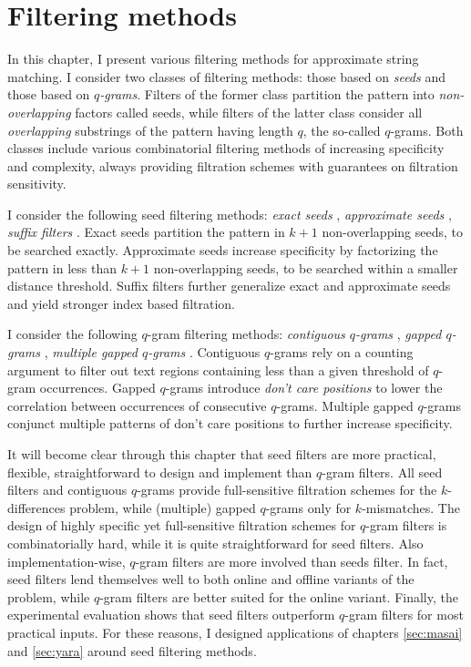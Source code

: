 \chapter{Filtering methods}
\label{sec:filter}

In this chapter, I present various filtering methods for approximate string matching.
I consider two classes of filtering methods: those based on \emph{seeds} and those based on \emph{$q$-grams}.
Filters of the former class partition the pattern into \emph{non-overlapping} factors called seeds, while filters of the latter class consider all \emph{overlapping} substrings of the pattern having length $q$, the so-called $q$-grams.
Both classes include various combinatorial filtering methods of increasing specificity and complexity, always providing filtration schemes with guarantees on filtration sensitivity.

I consider the following seed filtering methods:
\emph{exact seeds} \citep{Baeza1992},
\emph{approximate seeds} \citep{Myers1994,Navarro2000},
\emph{suffix filters} \citep{Kaerkkaeinen2007}.
Exact seeds partition the pattern in $k+1$ non-overlapping seeds, to be searched exactly.
Approximate seeds increase specificity by factorizing the pattern in less than $k+1$ non-overlapping seeds, to be searched within a smaller distance threshold.
Suffix filters further generalize exact and approximate seeds and yield stronger index based filtration.

I consider the following $q$-gram filtering methods:
\emph{contiguous $q$-grams} \citep{Jokinen1991},
\emph{gapped $q$-grams} \citep{Burkhardt2001},
\emph{multiple gapped $q$-grams} \citep{Kucherov2005}.
Contiguous $q$-grams rely on a counting argument to filter out text regions containing less than a given threshold of $q$-gram occurrences.
Gapped $q$-grams introduce \emph{don't care positions} to lower the correlation between occurrences of consecutive $q$-grams.
Multiple gapped $q$-grams conjunct multiple patterns of don't care positions to further increase specificity.

It will become clear through this chapter that seed filters are more practical, flexible, straightforward to design and implement than $q$-gram filters.
All seed filters and contiguous $q$-grams provide full-sensitive filtration schemes for the $k$-differences problem, while (multiple) gapped $q$-grams only for $k$-mismatches.
The design of highly specific yet full-sensitive filtration schemes for $q$-gram filters is combinatorially hard, while it is quite straightforward for seed filters.
Also implementation-wise, $q$-gram filters are more involved than seeds filter.
In fact, seed filters lend themselves well to both online and offline variants of the problem, while $q$-gram filters are better suited for the online variant.
Finally, the experimental evaluation shows that seed filters outperform $q$-gram filters for most practical inputs.
For these reasons, I designed applications of chapters \ref{sec:masai} and \ref{sec:yara} around seed filtering methods.

